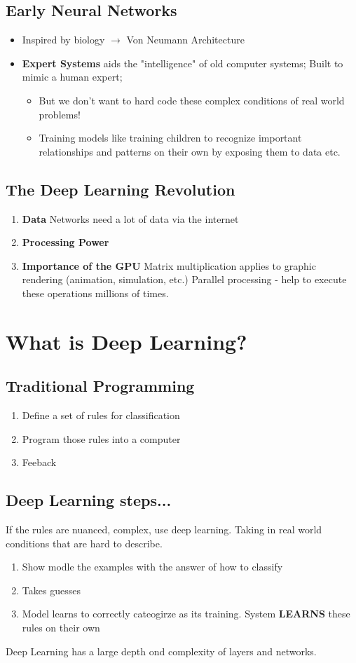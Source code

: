 \documentclass{article}
\begin{document}
\subsection{Early Neural Networks}
\begin{itemize}
    \item Inspired by biology $\rightarrow$ Von Neumann Architecture
    \item \textbf{Expert Systems} aids the "intelligence" of old computer systems; Built to mimic a human expert; 
    \begin{itemize}
        \item But we don't want to hard code these complex conditions of real world problems! 
        \item Training models like training children to recognize important relationships and patterns on their own by exposing them to data etc. 
    \end{itemize}
\end{itemize}
\subsection{The Deep Learning Revolution}
\begin{enumerate}
    \item \textbf{Data}
        Networks need a lot of data via the internet
    \item \textbf{Processing Power}
    \item \textbf{Importance of the GPU}
        Matrix multiplication applies to graphic rendering (animation, simulation, etc.) Parallel processing - help to execute these operations millions of times. 
\end{enumerate}

\section{What is Deep Learning?}
\subsection{Traditional Programming}
\begin{enumerate}
    \item Define a set of rules for classification
    \item Program those rules into a computer
    \item Feeback
\end{enumerate}
\subsection{Deep Learning steps...}
If the rules are nuanced, complex, use deep learning. Taking in real world conditions that are hard to describe. 
\begin{enumerate}
    \item Show modle the examples with the answer of how to classify
    \item Takes guesses
    \item Model learns to correctly cateogirze as its training. System \textbf{LEARNS} these rules on their own
\end{enumerate}
Deep Learning has a large depth ond complexity of layers and networks. 
\end{document}
